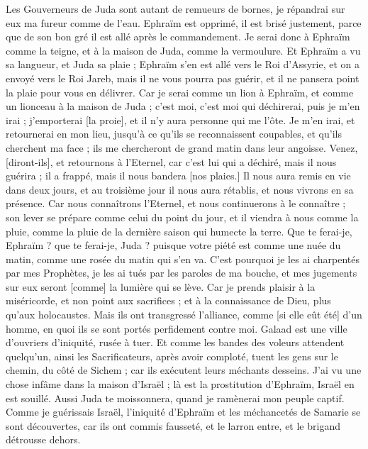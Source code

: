 \begin{multicols}{2}
Les Gouverneurs de Juda sont autant de remueurs de bornes, je répandrai sur eux ma fureur comme de l'eau.
Ephraïm est opprimé, il est brisé justement, parce que de son bon gré il est allé après le commandement.
Je serai donc à Ephraïm comme la teigne, et à la maison de Juda, comme la vermoulure.
Et Ephraïm a vu sa langueur, et Juda sa plaie ; Ephraïm s'en est allé vers le Roi d'Assyrie, et on a envoyé vers le Roi Jareb, mais il ne vous pourra pas guérir, et il ne pansera point la plaie pour vous en délivrer.
Car je serai comme un lion à Ephraïm, et comme un lionceau à la maison de Juda ; c'est moi, c'est moi qui déchirerai, puis je m'en irai ; j'emporterai [la proie], et il n'y aura personne qui me l'ôte.
Je m'en irai, et retournerai en mon lieu, jusqu'à ce qu'ils se reconnaissent coupables, et qu'ils cherchent ma face ; ils me chercheront de grand matin dans leur angoisse.
\VerseOne{}Venez, [diront-ils], et retournons à l'Eternel, car c'est lui qui a déchiré, mais il nous guérira ; il a frappé, mais il nous bandera [nos plaies.]
Il nous aura remis en vie dans deux jours, et au troisième jour il nous aura rétablis, et nous vivrons en sa présence.
Car nous connaîtrons l'Eternel, et nous continuerons à le connaître ; son lever se prépare comme celui du point du jour, et il viendra à nous comme la pluie, comme la pluie de la dernière saison qui humecte la terre.
Que te ferai-je, Ephraïm ? que te ferai-je, Juda ? puisque votre piété est comme une nuée du matin, comme une rosée du matin qui s'en va.
C'est pourquoi je les ai charpentés par mes Prophètes, je les ai tués par les paroles de ma bouche, et mes jugements sur eux seront [comme] la lumière qui se lève.
Car je prends plaisir à la miséricorde, et non point aux sacrifices ; et à la connaissance de Dieu, plus qu'aux holocaustes.
Mais ils ont transgressé l'alliance, comme [si elle eût été] d'un homme, en quoi ils se sont portés perfidement contre moi.
Galaad est une ville d'ouvriers d'iniquité, rusée à tuer.
Et comme les bandes des voleurs attendent quelqu'un, ainsi les Sacrificateurs, après avoir comploté, tuent les gens sur le chemin, du côté de Sichem ; car ils exécutent leurs méchants desseins.
J'ai vu une chose infâme dans la maison d'Israël ; là est la prostitution d'Ephraïm, Israël en est souillé.
Aussi Juda te moissonnera, quand je ramènerai mon peuple captif.
\VerseOne{}Comme je guérissais Israël, l'iniquité d'Ephraïm et les méchancetés de Samarie se sont découvertes, car ils ont commis fausseté, et le larron entre, et le brigand détrousse dehors.

\end{multicols}
